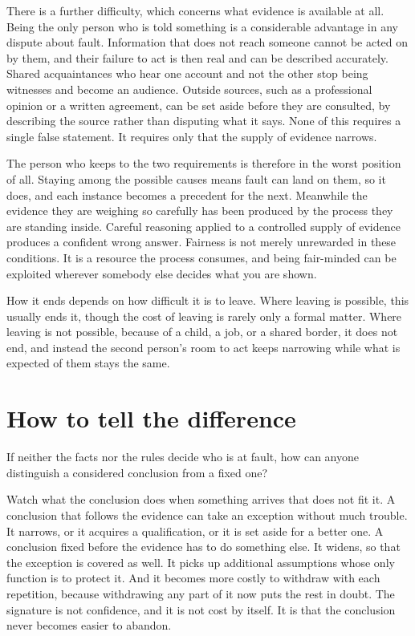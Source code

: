 \documentclass{article}
\begin{document}
There is a further difficulty, which concerns what evidence is available at all. Being the only person who is told something is a considerable advantage in any dispute about fault. Information that does not reach someone cannot be acted on by them, and their failure to act is then real and can be described accurately. Shared acquaintances who hear one account and not the other stop being witnesses and become an audience. Outside sources, such as a professional opinion or a written agreement, can be set aside before they are consulted, by describing the source rather than disputing what it says. None of this requires a single false statement. It requires only that the supply of evidence narrows.

The person who keeps to the two requirements is therefore in the worst position of all. Staying among the possible causes means fault can land on them, so it does, and each instance becomes a precedent for the next. Meanwhile the evidence they are weighing so carefully has been produced by the process they are standing inside. Careful reasoning applied to a controlled supply of evidence produces a confident wrong answer. Fairness is not merely unrewarded in these conditions. It is a resource the process consumes, and being fair-minded can be exploited wherever somebody else decides what you are shown.

How it ends depends on how difficult it is to leave. Where leaving is possible, this usually ends it, though the cost of leaving is rarely only a formal matter. Where leaving is not possible, because of a child, a job, or a shared border, it does not end, and instead the second person's room to act keeps narrowing while what is expected of them stays the same.

\section{How to tell the difference}
If neither the facts nor the rules decide who is at fault, how can anyone distinguish a considered conclusion from a fixed one?

Watch what the conclusion does when something arrives that does not fit it. A conclusion that follows the evidence can take an exception without much trouble. It narrows, or it acquires a qualification, or it is set aside for a better one. A conclusion fixed before the evidence has to do something else. It widens, so that the exception is covered as well. It picks up additional assumptions whose only function is to protect it. And it becomes more costly to withdraw with each repetition, because withdrawing any part of it now puts the rest in doubt. The signature is not confidence, and it is not cost by itself. It is that the conclusion never becomes easier to abandon.
\end{document}
